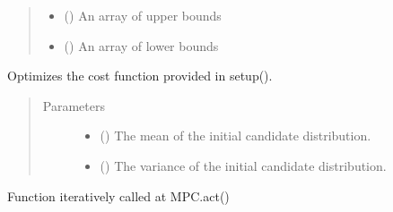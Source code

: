 \documentclass[letterpaper,10pt,english,openany,oneside]{sphinxmanual}
\begin{document}
\begin{fulllineitems}
\begin{quote}
\begin{description}
\begin{itemize}
\item {} 
 () \textendash{} An array of upper bounds

\item {} 
 () \textendash{} An array of lower bounds

\end{itemize}

\end{description}\end{quote}

\begin{fulllineitems}
\label{\detokenize{_modules/misc.optimizers:misc.optimizers.random.RandomOptimizer.obtain_solution}}
Optimizes the cost function provided in setup().
\begin{quote}\begin{description}
\item[{Parameters}] \leavevmode\begin{itemize}
\item {} 
 () \textendash{} The mean of the initial candidate distribution.

\item {} 
 () \textendash{} The variance of the initial candidate distribution.

\end{itemize}

\end{description}\end{quote}

\end{fulllineitems}


\begin{fulllineitems}
\label{\detokenize{_modules/misc.optimizers:misc.optimizers.random.RandomOptimizer.reset}}
Function iteratively called at MPC.act()


\end{fulllineitems}
\end{fulllineitems}
\end{document}
